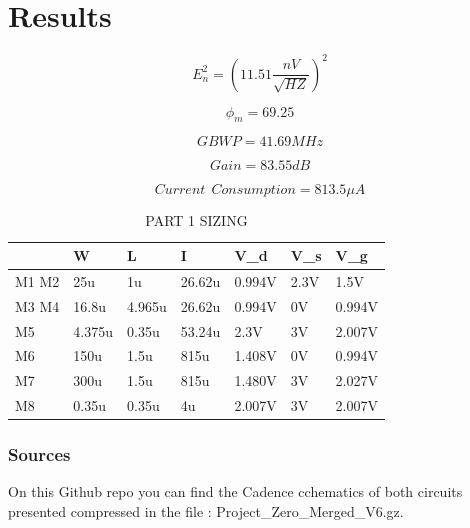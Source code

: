 

\section{Results} %
\label{sec:results}


\begin{equation}
  E_n^2=( 11.51 \frac {nV} { \sqrt{HZ}})^2
\end{equation}

\begin{equation}
  \phi_m=69.25
\end{equation}

\begin{equation}
  GBWP=41.69MHz
\end{equation}

\begin{equation}
  Gain=83.55dB
\end{equation}

\begin{equation}
  Current \ \ Consumption = 813.5 \mu A
\end{equation}


\begin{table}[]
\centering
\caption{PART 1 SIZING}
\label{my-label}
\begin{tabular}{|l|l|l|l|l|l|l|}
\hline
      & W      & L      & I      & V\_d   & V\_s & V\_g   \\ \hline
M1 M2 & 25u    & 1u     & 26.62u & 0.994V & 2.3V & 1.5V   \\ \hline
M3 M4 & 16.8u  & 4.965u & 26.62u & 0.994V & 0V   & 0.994V \\ \hline
M5    & 4.375u & 0.35u  & 53.24u & 2.3V   & 3V   & 2.007V \\ \hline
M6    & 150u   & 1.5u   & 815u   & 1.408V & 0V   & 0.994V \\ \hline
M7    & 300u   & 1.5u   & 815u   & 1.480V & 3V   & 2.027V \\ \hline
M8    & 0.35u  & 0.35u  & 4u     & 2.007V & 3V   & 2.007V \\ \hline
\end{tabular}
\end{table}


\subsubsection{Sources} %
\label{ssub:sources}


On this Github repo you can find the Cadence cchematics of both circuits presented compressed in the file : Project_Zero_Merged_V6.gz.



